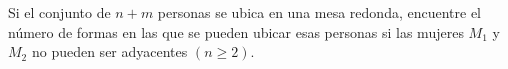 Si el conjunto de \(n+m\) personas se ubica en una mesa redonda, encuentre el número de formas en las que se pueden ubicar esas personas si las mujeres \(M_1\) y \(M_2\) no pueden ser adyacentes \((n \ge 2)\).
